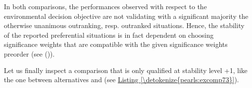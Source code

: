 \documentclass[a4paper,12pt,english]{sphinxhowto}
\begin{document}
\sphinxAtStartPar
In both comparisons, the performances observed with respect to the environmental decision objective are not validating with a significant majority the otherwise unanimous outranking, resp. outranked situations. Hence, the stability of the reported preferential situations is in fact dependent on choosing significance weights that are compatible with the given significance weights preorder (see {\hyperref[\detokenize{pearls:weightspreorder}]{}} ()).

\sphinxAtStartPar
Let us finally inspect a comparison that is only qualified at stability level +1, like the one between alternatives  and  (see \hyperref[\detokenize{pearls:excomp73}]{Listing \ref{\detokenize{pearls:excomp73}}}).
\def\sphinxLiteralBlockLabel{\label{\detokenize{pearls:excomp73}}}
\end{document}
